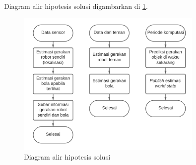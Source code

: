 Diagram alir hipotesis solusi digambarkan di \ref{fig:solution-flowchart}.

\begin{figure}[h]
    \centering
    \includegraphics[width=0.8\textwidth]{resources/solution-flowchart.png}
    \caption{Diagram alir hipotesis solusi}
    \label{fig:solution-flowchart}
\end{figure}